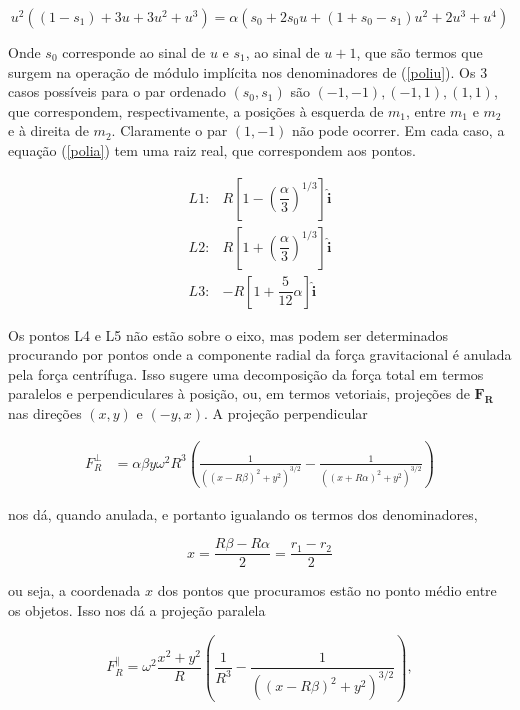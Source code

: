 \begin{equation}
u^2((1-s_1)+3u+3u^2+u^3) = \alpha(s_0 +2s_0u+(1+s_0-s_1)u^2+2u^3+u^4) \label{polia}
\end{equation}

Onde $s_0$ corresponde ao sinal de $u$ e $s_1$, ao sinal de $u+1$, que são termos que surgem na operação de módulo implícita nos denominadores de (\ref{poliu}). Os 3 casos possíveis para o par ordenado $(s_0,s_1)$ são $(-1,-1), (-1,1), (1,1)$, que correspondem, respectivamente, a posições à esquerda de $m_1$, entre $m_1$ e $m_2$ e à direita de $m_2$. Claramente o par $(1,-1)$ não pode ocorrer. Em cada caso, a equação (\ref{polia}) tem uma raiz real, que correspondem aos pontos.

\begin{eqnarray}
L1: & R\left[1-\left(\dfrac{\alpha}{3}\right)^{1/3}\right]\mathbf{\hat{i}} \\
L2: & R\left[1+\left(\dfrac{\alpha}{3}\right)^{1/3}\right]\mathbf{\hat{i}} \\
L3: & -R\left[1 + \dfrac{5}{12}\alpha \right]\mathbf{\hat{i}}
\end{eqnarray}

Os pontos L4 e L5 não estão sobre o eixo, mas podem ser determinados procurando por pontos onde a componente radial da força gravitacional é anulada pela força centrífuga. Isso sugere uma decomposição da força total em termos paralelos e perpendiculares à posição, ou, em termos vetoriais, projeções de $\mathbf{F_R}$ nas direções $(x, y)$ e $(-y, x)$. A projeção perpendicular

\begin{align}
    F_R^\perp &= \alpha\beta y \omega^2R^3\left( \frac{1}{((x-R\beta)^2+y^2)^{3/2}} - \frac{1}{((x + R\alpha)^2+y^2)^{3/2}} \right)
\end{align}

nos dá, quando anulada, e portanto igualando os termos dos denominadores,

\begin{equation}
    x = \frac{R\beta - R\alpha}{2} = \frac{r_1 - r_2}{2}
\end{equation}

ou seja, a coordenada $x$ dos pontos que procuramos estão no ponto médio entre os objetos. Isso nos dá a projeção paralela

\begin{equation}
    F_R^\parallel = \omega^2\frac{x^2 + y^2}{R}\left( \frac{1}{R^3} - \frac{1}{((x-R\beta)^2 + y^2)^{3/2}}\right),
\end{equation}

